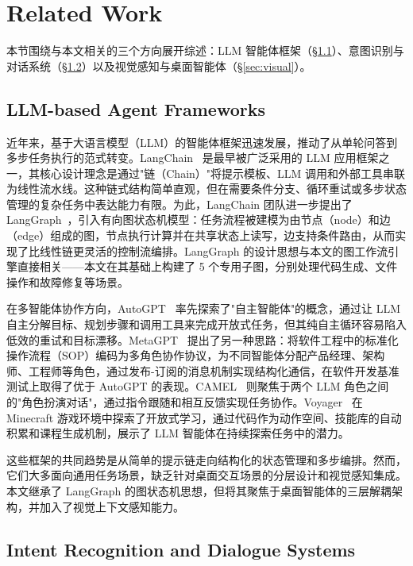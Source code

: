 \section{Related Work}\label{sec:related}

本节围绕与本文相关的三个方向展开综述：LLM 智能体框架（\S\ref{sec:llm-agents}）、意图识别与对话系统（\S\ref{sec:intent}）以及视觉感知与桌面智能体（\S\ref{sec:visual}）。

\subsection{LLM-based Agent Frameworks}\label{sec:llm-agents}

近年来，基于大语言模型（LLM）的智能体框架迅速发展，推动了从单轮问答到多步任务执行的范式转变。LangChain~\cite{chase2022langchain} 是最早被广泛采用的 LLM 应用框架之一，其核心设计理念是通过"链（Chain）"将提示模板、LLM 调用和外部工具串联为线性流水线。这种链式结构简单直观，但在需要条件分支、循环重试或多步状态管理的复杂任务中表达能力有限。为此，LangChain 团队进一步提出了 LangGraph~\cite{langchain2024langgraph}，引入有向图状态机模型：任务流程被建模为由节点（node）和边（edge）组成的图，节点执行计算并在共享状态上读写，边支持条件路由，从而实现了比线性链更灵活的控制流编排。LangGraph 的设计思想与本文的图工作流引擎直接相关——本文在其基础上构建了 5 个专用子图，分别处理代码生成、文件操作和故障修复等场景。

在多智能体协作方向，AutoGPT~\cite{richards2023autogpt} 率先探索了"自主智能体"的概念，通过让 LLM 自主分解目标、规划步骤和调用工具来完成开放式任务，但其纯自主循环容易陷入低效的重试和目标漂移。MetaGPT~\cite{hong2023metagpt} 提出了另一种思路：将软件工程中的标准化操作流程（SOP）编码为多角色协作协议，为不同智能体分配产品经理、架构师、工程师等角色，通过发布-订阅的消息机制实现结构化通信，在软件开发基准测试上取得了优于 AutoGPT 的表现。CAMEL~\cite{li2023camel} 则聚焦于两个 LLM 角色之间的"角色扮演对话"，通过指令跟随和相互反馈实现任务协作。Voyager~\cite{wang2023voyager} 在 Minecraft 游戏环境中探索了开放式学习，通过代码作为动作空间、技能库的自动积累和课程生成机制，展示了 LLM 智能体在持续探索任务中的潜力。

这些框架的共同趋势是从简单的提示链走向结构化的状态管理和多步编排。然而，它们大多面向通用任务场景，缺乏针对桌面交互场景的分层设计和视觉感知集成。本文继承了 LangGraph 的图状态机思想，但将其聚焦于桌面智能体的三层解耦架构，并加入了视觉上下文感知能力。

\subsection{Intent Recognition and Dialogue Systems}\label{sec:intent}

